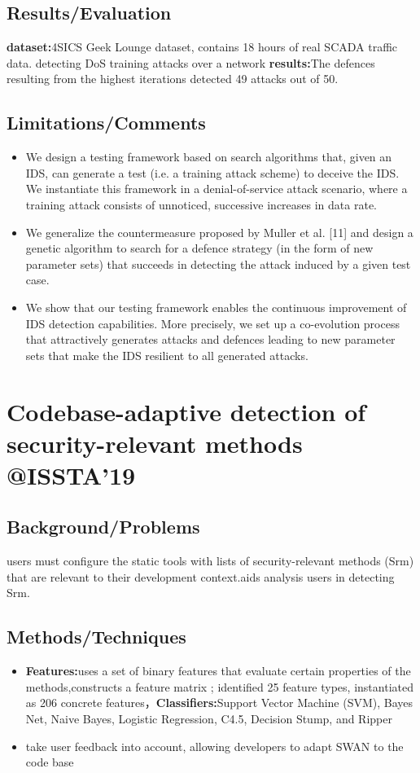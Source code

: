 \subsection{Results/Evaluation}
\textbf{dataset:}4SICS Geek Lounge dataset, contains 18 hours of real SCADA
traffic data. detecting DoS training attacks over a network
\textbf{results:}The defences resulting from the highest iterations detected 49 attacks out of 50.
\subsection{Limitations/Comments}
\begin{itemize}
	\item We design a testing framework based on search algorithms that, given an IDS, can generate a test (i.e. a training attack scheme) to deceive the IDS. We instantiate this framework in a denial-of-service attack scenario, where a training attack consists of unnoticed, successive increases in data rate. 
	\item We generalize the countermeasure proposed by Muller et al. [11] and design a genetic algorithm to search for a defence strategy (in the form of new parameter sets) that succeeds in detecting the attack induced by a given test case.
	\item We show that our testing framework enables the continuous improvement of IDS detection capabilities. More precisely, we set up a co-evolution process that attractively generates attacks and defences leading to new parameter sets that make the IDS resilient to all generated attacks.
\end{itemize}
\newpage

\section{Codebase-adaptive detection of security-relevant methods @ISSTA'19}
\subsection{Background/Problems}
users must configure the static tools with lists of security-relevant methods (Srm) that are relevant to their development context.aids analysis users in detecting Srm.
\subsection{Methods/Techniques}
\begin{itemize}
	\item \textbf{Features:}uses a set of binary features that evaluate certain properties of the methods,constructs a feature matrix ; identified 25 feature types, instantiated as 206 concrete features，\textbf{Classifiers:}Support Vector Machine (SVM), Bayes Net, Naive Bayes, Logistic
Regression, C4.5, Decision Stump, and Ripper
    \item  take user feedback into account, allowing developers to adapt SWAN to the code base
\end{itemize}

